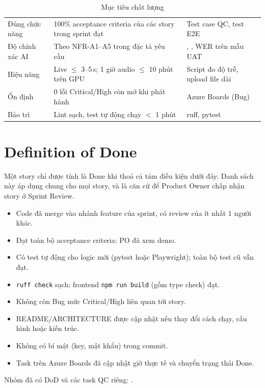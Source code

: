 \documentclass[12pt,a4paper]{report}
\begin{document}
\begin{table}[htbp]
  \centering
  \caption{Mục tiêu chất lượng}
  \label{tab:quality-goals}
  \small
  \begin{tabularx}{\linewidth}{@{}P{2.9cm}LP{5.4cm}@{}}
    \toprule
     &  &  \\
    \midrule
    Đúng chức năng & 100\% acceptance criteria của các story trong sprint đạt & Test case QC, test E2E \\
    Độ chính xác AI & Theo NFR-A1--A5 trong đặc tả yêu cầu~\cite{srs}
      & , , WER trên mẫu UAT \\
    Hiệu năng & Live $\leq$ 3--5\,s; 1 giờ audio $\leq$ 10 phút trên GPU & Script đo độ trễ, upload file dài \\
    Ổn định & 0 lỗi Critical/High còn mở khi phát hành & Azure Boards (Bug) \\
    Bảo trì & Lint sạch, test tự động chạy $<$ 1 phút & ruff, pytest \\
    \bottomrule
  \end{tabularx}
\end{table}

\section{Definition of Done}
\label{sec:dod}

Một story chỉ được tính là Done khi thoả cả tám điều kiện dưới đây. Danh sách này áp dụng chung cho mọi story,
và là căn cứ để Product Owner chấp nhận story ở Sprint Review.
\begin{itemize}[label=$\square$]
  \item Code đã merge vào nhánh feature của sprint, có review của ít nhất 1 người khác.
  \item Đạt toàn bộ acceptance criteria; PO đã xem demo.
  \item Có test tự động cho logic mới (pytest hoặc Playwright); toàn bộ test cũ vẫn đạt.
  \item \texttt{ruff check} sạch; frontend \texttt{npm run build} (gồm type check) đạt.
  \item Không còn Bug mức Critical/High liên quan tới story.
  \item README/ARCHITECTURE được cập nhật nếu thay đổi cách chạy, cấu hình hoặc kiến trúc.
  \item Không có bí mật (key, mật khẩu) trong commit.
  \item Task trên Azure Boards đã cập nhật giờ thực tế và chuyển trạng thái Done.
\end{itemize}
Nhóm đã có DoD và các task QC riêng: .
\end{document}
